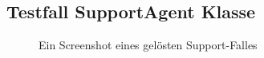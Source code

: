 \subsection{Testfall SupportAgent Klasse}
\label{app:Test}
\vspace{20mm}
\newcommand{\listingsttfamily}{\fontfamily{NotoSansMono-TLF}\small}

\clearpage
\begin{figure}[htb]
\centering
{}
\caption{Ein Screenshot eines gelösten Support-Falles}
\end{figure}
